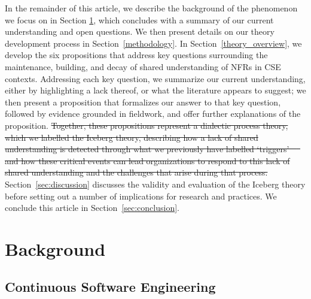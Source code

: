 \documentclass[smallextended]{svjour3}        %
\providecommand{\DIFdeltex}[1]{{\protect\color{red}\sout{#1}}} %
\providecommand{\DIFaddend}{} %
\providecommand{\DIFdelbegin}{} %
\providecommand{\DIFdelend}{} %
\providecommand{\DIFdel}[1]{\texorpdfstring{\DIFdeltex{#1}}{}} %
\newcommand{\DIFscaledelfig}{0.5}
\newlength{\DIFdelgraphicswidth} %
\newlength{\DIFdelgraphicsheight} %
\newcommand{\DIFdelincludegraphics}[2][]{%
\sbox{\DIFdelgraphicsbox}{\DIFOincludegraphics[#1]{#2}}%
\settoboxwidth{\DIFdelgraphicswidth}{\DIFdelgraphicsbox} %
\settoboxtotalheight{\DIFdelgraphicsheight}{\DIFdelgraphicsbox} %
\scalebox{\DIFscaledelfig}{%
\parbox[b]{\DIFdelgraphicswidth}{\usebox{\DIFdelgraphicsbox}\\[-\baselineskip] \rule{\DIFdelgraphicswidth}{0em}}\llap{\resizebox{\DIFdelgraphicswidth}{\DIFdelgraphicsheight}{%
\setlength{\unitlength}{\DIFdelgraphicswidth}%
\begin{picture}(1,1)%
\thicklines\linethickness{2pt} %
{\color[rgb]{1,0,0}\put(0,0){\framebox(1,1){}}}%
{\color[rgb]{1,0,0}\put(0,0){\line( 1,1){1}}}%
{\color[rgb]{1,0,0}\put(0,1){\line(1,-1){1}}}%
\end{picture}%
}\hspace*{3pt}}} %
} %
\DeclareRobustCommand{\DIFaddend}{\DIFOaddend \let\includegraphics\DIFOincludegraphics} %
\DeclareRobustCommand{\DIFdelbegin}{\DIFOdelbegin \let\includegraphics\DIFdelincludegraphics} %
\DeclareRobustCommand{\DIFdelend}{\DIFOaddend \let\includegraphics\DIFOincludegraphics} %
\begin{document}
\DIFaddend In the remainder of this article, we describe the background of the phenomenon we focus on in Section \ref{background}, which concludes with a summary of our current understanding and open questions. We then present details on our theory development process in Section~\ref{methodology}.
In Section~\ref{theory_overview}, we develop the six propositions that address key questions surrounding the maintenance, building, and decay of shared understanding of NFRs in CSE contexts. Addressing each key question, we summarize our current understanding, either by highlighting a lack thereof, or what the  literature appears to suggest; we then present a proposition that formalizes our answer to that key question, followed by evidence grounded in fieldwork, and offer further explanations of the proposition. 
\DIFdelbegin \DIFdel{Together, these propositions represent a dialectic process theory, which we labelled the Iceberg theory, describing how a lack of shared understanding is detected through what we previously have labelled `triggers' \mbox{%
\citep{werner2020re} }\hskip0pt%
and how these critical events can lead organizations to respond to this lack of shared understanding and the challenges that arise during that process.
}\DIFdelend Section~\ref{sec:discussion} discusses the validity and evaluation of the Iceberg theory before setting out a number of implications for research and practices. We conclude this article in Section~\ref{sec:conclusion}.


\section{Background}
\label{background}


\subsection{Continuous Software Engineering}
\end{document}

